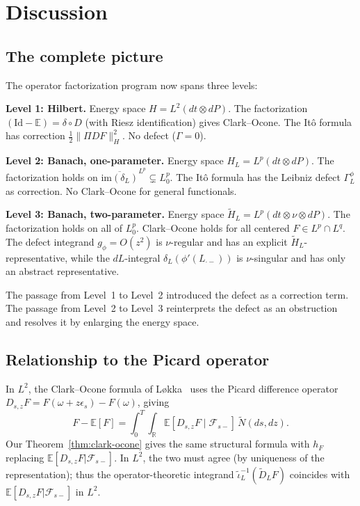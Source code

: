 \documentclass[11pt,a4paper]{article}
\theoremstyle{plain}
\theoremstyle{definition}
\theoremstyle{remark}
\newcommand{\Id}{\mathrm{Id}}
\newcommand{\E}{\mathbb{E}}
\newcommand{\R}{\mathbb{R}}
\newcommand{\im}{\mathrm{im}}
\begin{document}
\section{Discussion}\label{sec:discussion}

\subsection{The complete picture}

The operator factorization program now spans three levels:

\medskip\noindent\textbf{Level 1: Hilbert.}
Energy space $H = L^2(dt\otimes dP)$.  The factorization
$(\Id - \E) = \delta \circ D$ (with Riesz identification)
gives Clark--Ocone.  The It\^o formula has correction
$\frac{1}{2}\|\Pi DF\|_H^2$.  No defect ($\Gamma = 0$).

\medskip\noindent\textbf{Level 2: Banach, one-parameter.}
Energy space $H_L = L^p(dt\otimes dP)$.  The factorization
holds on $\overline{\im(\delta_L)}^{L^p} \subsetneq L^p_0$.
The It\^o formula has the Leibniz defect $\Gamma_L^{\phi}$
as correction.  No Clark--Ocone for general functionals.

\medskip\noindent\textbf{Level 3: Banach, two-parameter.}
Energy space $\widetilde{H}_L = L^p(dt\otimes\nu\otimes dP)$.
The factorization holds on all of $L^p_0$.  Clark--Ocone
holds for all centered $F \in L^p \cap L^q$.  The defect
integrand $g_\phi = O(z^2)$ is $\nu$-regular and has an
explicit $\widetilde{H}_L$-representative, while the
$dL$-integral $\delta_L(\phi'(L_{\cdot-}))$ is $\nu$-singular
and has only an abstract representative.

\medskip
The passage from Level~1 to Level~2 introduced the defect
as a correction term.  The passage from Level~2 to Level~3
reinterprets the defect as an obstruction and resolves it
by enlarging the energy space.

\subsection{Relationship to the Picard operator}

In $L^2$, the Clark--Ocone formula of
L{\o}kka~\cite{Lokka2004} uses the Picard difference operator
$D_{s,z}F = F(\omega + z\epsilon_s) - F(\omega)$, giving
\[
  F - \E[F] = \int_0^T\!\!\int_\R
  \E[D_{s,z}F \mid \mathcal{F}_{s-}]\,
  \widetilde{N}(ds,dz).
\]
Our Theorem~\ref{thm:clark-ocone} gives the same structural
formula with $h_F$ replacing $\E[D_{s,z}F|\mathcal{F}_{s-}]$.
In $L^2$, the two must agree (by uniqueness of the representation);
thus the operator-theoretic integrand
$\widetilde{\iota}_L^{-1}(\widetilde{D}_L F)$ coincides
with $\E[D_{s,z}F|\mathcal{F}_{s-}]$ in $L^2$.
\end{document}
